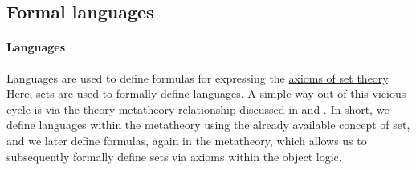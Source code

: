 \subsection{Formal languages}\label{subsec:formal_languages}

\paragraph{Languages}

Languages are used to define formulas for expressing the \hyperref[def:zfc]{axioms of set theory}. Here, sets are used to formally define languages. A simple way out of this vicious cycle is via the theory-metatheory relationship discussed in  and . In short, we define languages within the metatheory using the already available concept of set, and we later define formulas, again in the metatheory, which allows us to subsequently formally define sets via axioms within the object logic.


